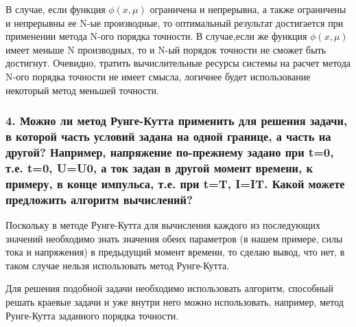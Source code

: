 В случае, если функция $\phi(x, \mu)$  ограничена и непрерывна, а также ограничены и непрерывны ее N-ые производные, то оптимальный результат достигается при применении метода N-ого порядка точности. В случае,если же функция $\phi(x, \mu)$ имеет меньше N производных, то и N-ый порядок точности не сможет быть достигнут. Очевидно, тратить вычислительные ресурсы системы на расчет метода N-ого порядка точности не имеет смысла, логичнее будет использование некоторый метод меньшей точности.


\subsubsection{4. Можно ли метод Рунге-Кутта применить для решения задачи, в которой часть условий задана на одной границе, а часть на другой? Например, напряжение по-прежнему задано при t=0, т.е. t=0, U=U0, а ток задан в другой момент времени, к примеру, в конце импульса, т.е. при t=T, I=IT. Какой можете предложить алгоритм вычислений?}

Поскольку в методе Рунге-Кутта для вычисления каждого из последующих значений необходимо знать значения обеих параметров (в нашем примере, силы тока и напряжения) в предыдущий момент времени, то сделаю вывод, что нет, в таком случае нельзя использовать метод Рунге-Кутта.

Для решения подобной задачи необходимо использовать алгоритм, способный решать краевые задачи и уже внутри него можно использовать, например, метод Рунге-Кутта заданного порядка точности.

